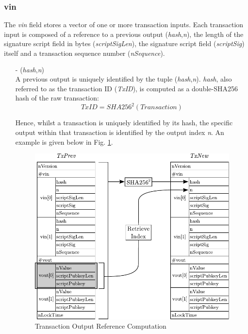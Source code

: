 \subsubsection*{vin}
The \textit{vin} field stores a vector of one or more transaction inputs. Each transaction input is composed of a reference to a previous output (\textit{hash},\textit{n}), the length of the signature script field in bytes (\textit{scriptSigLen}),
the signature script field (\textit{scriptSig}) itself and a transaction sequence number (\textit{nSequence}).

\begin{itemize}
\item[-] (\textit{hash},\textit{n})~\\
A previous output is uniquely identified by the tuple (\textit{hash},\textit{n}). \textit{hash}, also referred to as the transaction ID (\textit{TxID}), is computed as a double-SHA256 hash of the raw transaction:
\begin{equation}
TxID = SHA256^{2}(Transaction)
\end{equation}

Hence, whilst a transaction is uniquely identified by its hash, the specific output within that transaction is identified by the output index \textit{n}. An example is given below in Fig. \ref{fig:PrevOut}.
\begin{figure}[ht!]
 \centering
 \includegraphics[scale=0.9]{images/Transaction2In2Out.pdf}
 \caption{Transaction Output Reference Computation} \label{fig:PrevOut}
\end{figure}


\end{itemize}
